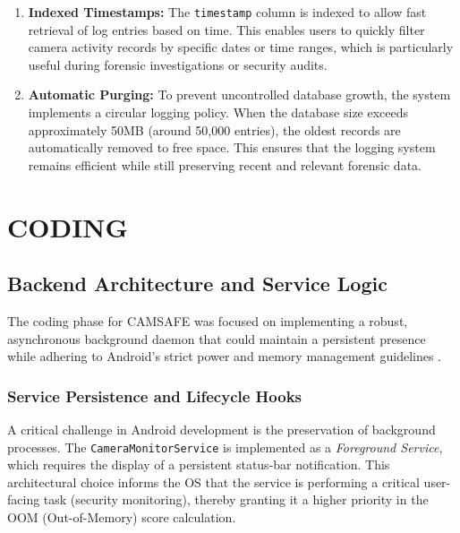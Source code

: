 \documentclass[12pt,a4paper]{report}
\begin{document}
\begin{enumerate}
\begin{enumerate}
\item \textbf{Indexed Timestamps:}  
The \texttt{timestamp} column is indexed to allow fast retrieval of log entries
based on time. This enables users to quickly filter camera activity records by
specific dates or time ranges, which is particularly useful during forensic
investigations or security audits.

\item \textbf{Automatic Purging:}  
To prevent uncontrolled database growth, the system implements a circular
logging policy. When the database size exceeds approximately 50MB (around
50,000 entries), the oldest records are automatically removed to free space.
This ensures that the logging system remains efficient while still preserving
recent and relevant forensic data.

\end{enumerate}

    \clearpage
    \chapter{CODING}
    \section{Backend Architecture and Service Logic}
    The coding phase for CAMSAFE was focused on implementing a robust, asynchronous background daemon that could maintain a persistent presence while adhering to Android's strict power and memory management guidelines \cite{androidhal}.

    \subsection{Service Persistence and Lifecycle Hooks}
    A critical challenge in Android development is the preservation of background processes. The \texttt{CameraMonitorService} is implemented as a \textit{Foreground Service}, which requires the display of a persistent status-bar notification. This architectural choice informs the OS that the service is performing a critical user-facing task (security monitoring), thereby granting it a higher priority in the OOM (Out-of-Memory) score calculation.

    




\end{enumerate}
\end{document}
